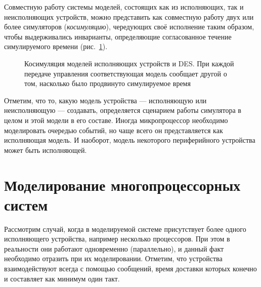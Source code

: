 Совместную работу системы моделей, состоящих как из исполняющих, так и неисполняющих устройств, можно представить как совместную работу двух или более симуляторов (\textit{косимуляцию}), чередующих своё исполнение таким образом, чтобы выдерживались инварианты, определяющие согласованное течение симулируемого времени (рис.~\ref{fig:cosim}).

\begin{figure}[htb]
    \centering
    \caption[Косимуляция моделей исполняющих устройств и DES]{Косимуляция моделей исполняющих устройств и DES. При каждой передаче управления соответствующая модель сообщает другой о том, насколько было продвинуто симулируемое время}
    \label{fig:cosim}
\end{figure}

Отметим, что то, какую модель устройства --- исполняющую или неисполняющую --- создавать, определяется сценарием работы симулятора в целом и этой модели в его составе. Иногда микропроцессор необходимо моделировать очередью событий, но чаще всего он представляется как исполняющая модель. И наоборот, модель некоторого периферийного устройства может быть исполняющей.

\section{Моделирование многопроцессорных систем}\label{sec:mp-simulation}

Рассмотрим случай, когда в моделируемой системе присутствует более одного исполняющего устройства, например несколько процессоров. При этом в реальности они работают одновременно (параллельно), и данный факт необходимо отразить при их моделировании. Отметим, что устройства взаимодействуют всегда с помощью сообщений, время доставки которых конечно и составляет как минимум один такт.

